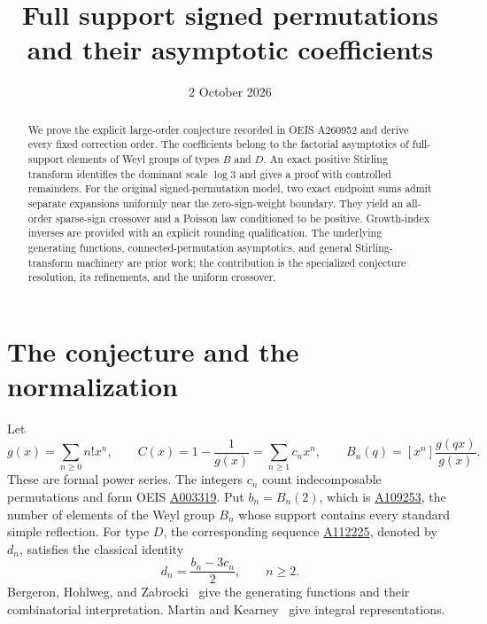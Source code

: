 \documentclass[11pt]{article}
\title{Full support signed permutations\\and their asymptotic coefficients}
\author{}
\date{2 October 2026}
\begin{document}
\maketitle
\begin{abstract}
We prove the explicit large-order conjecture recorded in OEIS A260952 and derive every fixed correction order. The coefficients belong to the factorial asymptotics of full-support elements of Weyl groups of types $B$ and $D$. An exact positive Stirling transform identifies the dominant scale $\log 3$ and gives a proof with controlled remainders. For the original signed-permutation model, two exact endpoint sums admit separate expansions uniformly near the zero-sign-weight boundary. They yield an all-order sparse-sign crossover and a Poisson law conditioned to be positive. Growth-index inverses are provided with an explicit rounding qualification. The underlying generating functions, connected-permutation asymptotics, and general Stirling-transform machinery are prior work; the contribution is the specialized conjecture resolution, its refinements, and the uniform crossover.
\end{abstract}

\section{The conjecture and the normalization}\label{fss:sec:conjecture}
Let
\begin{equation}\label{fss:eq:defs}
 g(x)=\sum_{n\ge0}n!x^n,\qquad C(x)=1-\frac1{g(x)}=\sum_{n\ge1}c_nx^n,
 \qquad B_n(q)=[x^n]\frac{g(qx)}{g(x)}.
\end{equation}
These are formal power series. The integers $c_n$ count indecomposable permutations and form OEIS \href{https://oeis.org/A003319}{A003319}. Put $b_n=B_n(2)$, which is \href{https://oeis.org/A109253}{A109253}, the number of elements of the Weyl group $B_n$ whose support contains every standard simple reflection. For type $D$, the corresponding sequence \href{https://oeis.org/A112225}{A112225}, denoted by $d_n$, satisfies the classical identity
\begin{equation}\label{fss:eq:D}
 d_n=\frac{b_n-3c_n}{2},\qquad n\ge2.
\end{equation}
Bergeron, Hohlweg, and Zabrocki~\cite{BHZ} give the generating functions and their combinatorial interpretation. Martin and Kearney~\cite{MK} give integral representations.
\end{document}
